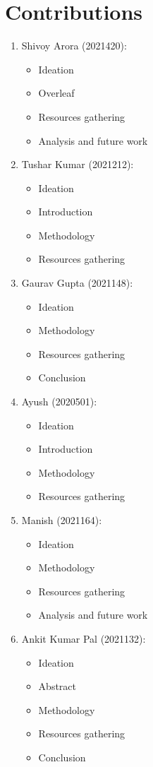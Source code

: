 \documentclass[acmtog]{acmart}
\begin{document}
\section*{Contributions}
\begin{enumerate}
    \item Shivoy Arora (2021420):
    \begin{itemize}
        \item Ideation
        \item Overleaf
        \item Resources gathering
        \item Analysis and future work
    \end{itemize}

    \item Tushar Kumar (2021212):
    \begin{itemize}
        \item Ideation
        \item Introduction
        \item Methodology
        \item Resources gathering
    \end{itemize}

    \item Gaurav Gupta (2021148):
    \begin{itemize}
        \item Ideation
        \item Methodology
        \item Resources gathering
        \item Conclusion
    \end{itemize}

    \item Ayush (2020501):
    \begin{itemize}
        \item Ideation
        \item Introduction
        \item Methodology
        \item Resources gathering
    \end{itemize}

    \item Manish (2021164):
    \begin{itemize}
        \item Ideation
        \item Methodology
        \item Resources gathering
        \item Analysis and future work
    \end{itemize}

    \item Ankit Kumar Pal (2021132):
    \begin{itemize}
        \item Ideation
        \item Abstract
        \item Methodology
        \item Resources gathering
        \item Conclusion
    \end{itemize}
\end{enumerate}
\end{document}

